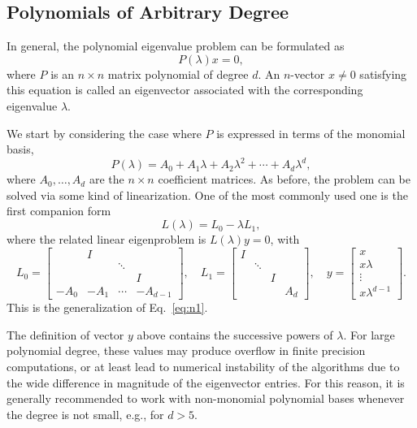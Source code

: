 \subsection{\label{sec:pep1}Polynomials of Arbitrary Degree}

In general, the polynomial eigenvalue problem can be formulated as
\begin{equation}
\label{eq:pep}
P(\lambda)x=0,
\end{equation}
where $P$ is an $n\times n$ matrix polynomial of degree $d$. An $n$-vector $x\neq 0$ satisfying this equation is called an eigenvector associated with the corresponding eigenvalue $\lambda$.

We start by considering the case where $P$ is expressed in terms of the monomial basis,
\begin{equation}
\label{eq:pepmon}
P(\lambda)=A_0+A_1 \lambda+A_2\lambda^2 +  \dotsb + A_d \lambda^d,
\end{equation}
where $A_0,\ldots,A_d$ are the $n\times n$ coefficient matrices. As before, the problem can be solved via some kind of linearization. One of the most commonly used one is the first companion form 
\begin{equation}
\label{eq:firstcomp}
L(\lambda)=L_0 -\lambda L_1,
\end{equation}
where the related linear eigenproblem is $L(\lambda)y=0$, with
\begin{equation}
\label{eq:firstcompfull}
L_0 =
\begin{bmatrix}
  & I \\
  & & \ddots \\
  & & & I \\
  -A_0 & -A_1 & \cdots  & -A_{d-1}
\end{bmatrix},\quad
L_1 =
\begin{bmatrix}
  I \\
  & \ddots \\
  & & I \\
  & & & A_d
\end{bmatrix}, \quad
y=
\begin{bmatrix}
  x \\ x\lambda\\ \vdots \\ x\lambda^{d-1}
\end{bmatrix}.
\end{equation}
This is the generalization of Eq.\ \ref{eq:n1}.

The definition of vector $y$ above contains the successive powers of $\lambda$. For large polynomial degree, these values may produce overflow in finite precision computations, or at least lead to numerical instability of the algorithms due to the wide difference in magnitude of the eigenvector entries. For this reason, it is generally recommended to work with non-monomial polynomial bases whenever the degree is not small, e.g., for $d>5$.

